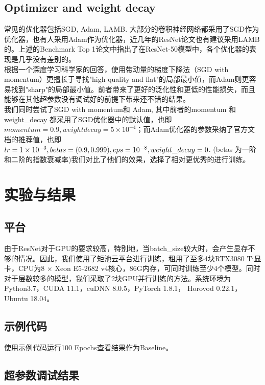 \documentclass[hyperref, UTF8, 12pt]{article}
\theoremstyle{definition}
\begin{document}
\subsection{Optimizer and weight decay}
常见的优化器包括SGD, Adam, LAMB. 大部分的卷积神经网络都采用了SGD作为优化器，也有人采用Adam作为优化器，近几年的ResNet论文也有建议采用LAMB的。上述的Benchmark Top 1\cite{dosovitskiy2021image}论文中指出了在ResNet-50模型中，各个优化器的表现是几乎没有差别的。\\
\indent
根据一个深度学习科学家的回答\cite{QuoraAnswer}，使用带动量的梯度下降法（SGD with momentum）更擅长于寻找"high-quality and flat"的局部最小值，而Adam则更容易找到"sharp"的局部最小值。前者带来了更好的泛化性和更低的性能损失，而且能够在其他超参数没有调试好的前提下带来还不错的结果。\\
\indent
我们同时尝试了SGD with momentum和 Adam, 其中前者的momentum 和weight\_decay 都采用了SGD优化器中的默认值，也即$momentum = 0.9, weight decay = 5 \times 10 ^ {-4}$；而Adam优化器的参数采纳了官方文档的推荐值，也即$lr = 1 \times 10^{-3}, \space betas=(0.9, 0.999), \space eps = 10 ^ {-8}, \space weight\_decay = 0$. (betas 为一阶和二阶的指数衰减率)我们对比了他们的效果，选择了相对更优秀的进行训练。

\section{实验与结果}
\subsection{平台}
由于ResNet对于GPU的要求较高，特别地，当batch\_size较大时，会产生显存不够的情况。因此，我们使用了矩池云平台进行训练，租用了至多4块RTX3080 Ti显卡，CPU为8 $\times$ Xeon E5-2682 v4核心，86G内存，可同时训练至少4个模型。同时对于层数较多的模型，我们采取了2块GPU并行训练的方法。系统环境为Python3.7，CUDA 11.1，cuDNN 8.0.5，PyTorch 1.8.1， Horovod 0.22.1，Ubuntu 18.04。

\subsection{示例代码}
使用示例代码运行100 Epochs查看结果作为Baseline。

\subsection{超参数调试结果}
\end{document}
